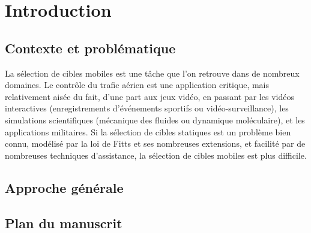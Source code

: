 

\chapter*{Introduction} %


\section*{Contexte et problématique}
    La sélection de cibles mobiles est une tâche que l'on retrouve dans de nombreux domaines. Le contrôle du trafic aérien est une application critique, mais relativement aisée du fait, d'une part aux jeux vidéo, en passant par les vidéos interactives (enregistrements d'événements sportifs ou vidéo-surveillance), les simulations scientifiques (mécanique des fluides ou dynamique moléculaire), et les applications militaires. Si la sélection de cibles statiques est un problème bien connu, modélisé par la loi de Fitts et ses nombreuses extensions, et facilité par de nombreuses techniques d'assistance, la sélection de cibles mobiles est plus difficile.
    



 
\section*{Approche générale}


\section*{Plan du manuscrit}
